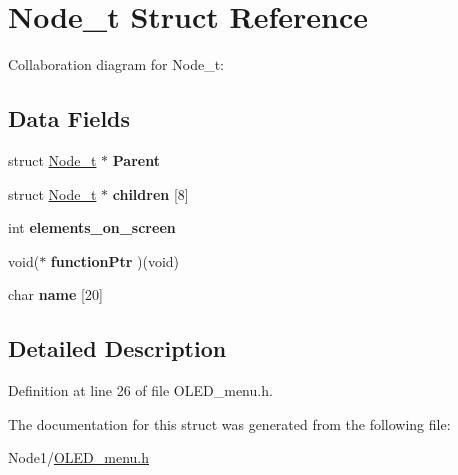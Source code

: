 \hypertarget{structNode__t}{}\section{Node\+\_\+t Struct Reference}
\label{structNode__t}


Collaboration diagram for Node\+\_\+t\+:
\subsection*{Data Fields}
\begin{DoxyCompactItemize}
\item 
\mbox{\label{structNode__t_ae9a007f68638f0b0498e18c56254e5cb}} 
struct \hyperlink{structNode__t}{Node\+\_\+t} $\ast$ {\bfseries Parent}
\item 
\mbox{\label{structNode__t_aa3195ca7a9e9d8676b6c43bea80ba432}} 
struct \hyperlink{structNode__t}{Node\+\_\+t} $\ast$ {\bfseries children} \mbox{[}8\mbox{]}
\item 
\mbox{\label{structNode__t_ae2c9d426c164e5e8247f705ad01f1cfb}} 
int {\bfseries elements\+\_\+on\+\_\+screen}
\item 
\mbox{\label{structNode__t_aa9c4643b3bd24c732c48cac981e29df7}} 
void($\ast$ {\bfseries function\+Ptr} )(void)
\item 
\mbox{\label{structNode__t_adc34669732a91f9e2c1b9bc5aae7c12b}} 
char {\bfseries name} \mbox{[}20\mbox{]}
\end{DoxyCompactItemize}


\subsection{Detailed Description}


Definition at line 26 of file O\+L\+E\+D\+\_\+menu.\+h.



The documentation for this struct was generated from the following file\+:\begin{DoxyCompactItemize}
\item 
Node1/\hyperlink{OLED__menu_8h}{O\+L\+E\+D\+\_\+menu.\+h}\end{DoxyCompactItemize}
